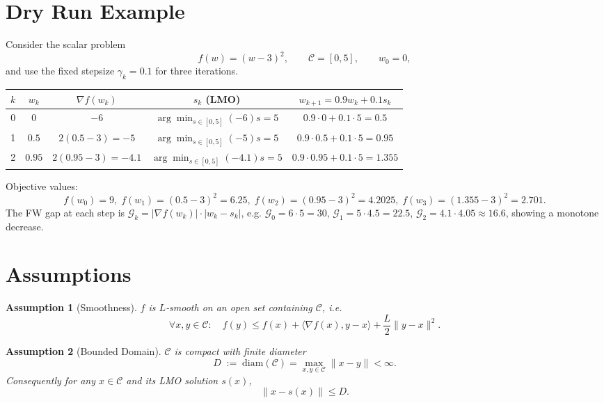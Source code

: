 \documentclass{article}
\newtheorem{assumption}{Assumption}
\newcommand{\diam}{\mathrm{diam}}
\newcommand{\gap}{\mathcal{G}}
\begin{document}
\section*{Dry Run Example}
Consider the scalar problem
\[
f(w)=(w-3)^{2},\qquad \mathcal C=[0,5],\qquad w_{0}=0,
\]
and use the fixed stepsize $\gamma_{k}=0.1$ for three iterations.

\begin{center}
\begin{tabular}{c|c|c|c|c}
$k$ & $w_{k}$ & $\nabla f(w_{k})$ & $s_{k}$ (LMO) & $w_{k+1}=0.9w_{k}+0.1s_{k}$\\\hline
0 & $0$ & $-6$ & $\displaystyle\arg\min_{s\in[0,5]}(-6)s=5$ & $0.9\cdot0+0.1\cdot5=0.5$\\
1 & $0.5$ & $2(0.5-3)=-5$ & $\displaystyle\arg\min_{s\in[0,5]}(-5)s=5$ & $0.9\cdot0.5+0.1\cdot5=0.95$\\
2 & $0.95$ & $2(0.95-3)=-4.1$ & $\displaystyle\arg\min_{s\in[0,5]}(-4.1)s=5$ & $0.9\cdot0.95+0.1\cdot5=1.355$\\
\end{tabular}
\end{center}
Objective values:
\[
f(w_{0})=9,\; f(w_{1})=(0.5-3)^{2}=6.25,\; f(w_{2})=(0.95-3)^{2}=4.2025,\; f(w_{3})=(1.355-3)^{2}=2.701.
\]
The FW gap at each step is $\gap_{k}=|\nabla f(w_{k})|\cdot|w_{k}-s_{k}|$, e.g. $\gap_{0}=6\cdot5=30$, $\gap_{1}=5\cdot4.5=22.5$, $\gap_{2}=4.1\cdot4.05\approx16.6$, showing a monotone decrease.

\section*{Assumptions}
\begin{assumption}[Smoothness]\label{as:smooth}
$f$ is $L$‑smooth on an open set containing $\mathcal C$, i.e.
\[
\forall x,y\in\mathcal C:\quad 
f(y)\le f(x)+\langle\nabla f(x),y-x\rangle+\frac{L}{2}\|y-x\|^{2}.
\tag{4}
\]
\end{assumption}

\begin{assumption}[Bounded Domain]\label{as:bounded}
$\mathcal C$ is compact with finite diameter
\[
D\;:=\;\diam(\mathcal C)=\max_{x,y\in\mathcal C}\|x-y\|<\infty .
\tag{5}
\]
Consequently for any $x\in\mathcal C$ and its LMO solution $s(x)$,
\[
\|x-s(x)\|\le D .
\tag{6}
\]
\end{assumption}
\end{document}
